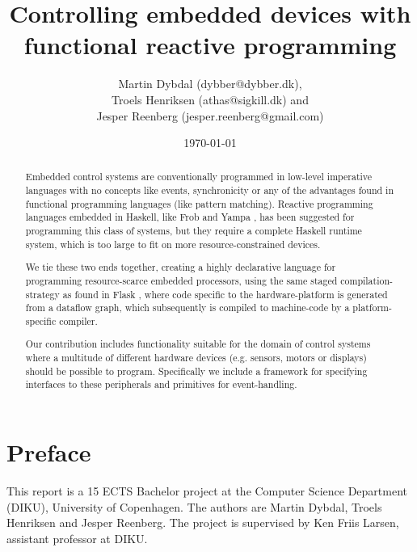 \documentclass[a4paper, oneside, final]{memoir}
\title{Controlling embedded devices with functional reactive programming}
\author{Martin Dybdal (dybber@dybber.dk), \\
Troels Henriksen (athas@sigkill.dk) and \\
Jesper Reenberg (jesper.reenberg@gmail.com)
}
\date{\today}
\begin{document}
\frontmatter

\maketitle
\thispagestyle{empty}

\begin{abstract}
  Embedded control systems are conventionally programmed in low-level
  imperative languages with no concepts like events, synchronicity or
  any of the advantages found in functional programming languages
  (like pattern matching). Reactive programming languages embedded in
  Haskell, like Frob \cite{frob99} and Yampa \cite{arrowsrobotsfrp02},
  has been suggested for programming this class of systems, but they
  require a complete Haskell runtime system, which is too large to fit
  on more resource-constrained devices.

  We tie these two ends together, creating a highly declarative
  language for programming resource-scarce embedded processors, using
  the same staged com\-pi\-la\-tion-strategy as found in Flask
  \cite{flask08}, where code specific to the hardware-platform is
  generated from a dataflow graph, which subsequently is compiled to
  machine-code by a platform-specific compiler.

  Our contribution includes functionality suitable for the domain of
  control systems where a multitude of different hardware devices
  (e.g. sensors, motors or displays) should be possible to
  program. Specifically we include a framework for specifying
  interfaces to these peripherals and primitives for
  event-handling. 

\end{abstract}

\clearpage 
\chapter*{Preface}
This report is a 15 ECTS Bachelor project at the Computer Science
Department (DIKU), University of Copenhagen. The authors are Martin
Dybdal, Troels Henriksen and Jesper Reenberg. The project is
supervised by Ken Friis Larsen, assistant professor at DIKU.

\clearpage

\tableofcontents*


\end{document}
